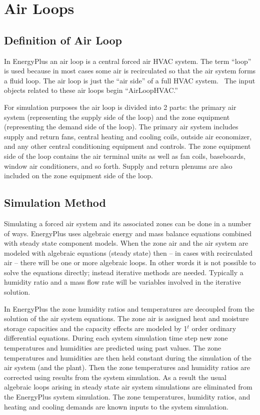 \section{Air Loops}\label{air-loops}

\subsection{Definition of Air Loop}\label{definition-of-air-loop}

In EnergyPlus an air loop is a central forced air HVAC system. The term ``loop'' is used because in most cases some air is recirculated so that the air system forms a fluid loop. The air loop is just the ``air side'' of a full HVAC system.~ The input objects related to these air loops begin ``AirLoopHVAC.''

For simulation purposes the air loop is divided into 2 parts: the primary air system (representing the supply side of the loop) and the zone equipment (representing the demand side of the loop). The primary air system includes supply and return fans, central heating and cooling coils, outside air economizer, and any other central conditioning equipment and controls. The zone equipment side of the loop contains the air terminal units as well as fan coils, baseboards, window air conditioners, and so forth. Supply and return plenums are also included on the zone equipment side of the loop.

\subsection{Simulation Method}\label{simulation-method}

Simulating a forced air system and its associated zones can be done in a number of ways. EnergyPlus uses algebraic energy and mass balance equations combined with steady state component models. When the zone air and the air system are modeled with algebraic equations (steady state) then -- in cases with recirculated air -- there will be one or more algebraic loops. In other words it is not possible to solve the equations directly; instead iterative methods are needed. Typically a humidity ratio and a mass flow rate will be variables involved in the iterative solution.

In EnergyPlus the zone humidity ratios and temperatures are decoupled from the solution of the air system equations. The zone air is assigned heat and moisture storage capacities and the capacity effects are modeled by 1\(^{t}\) order ordinary differential equations. During each system simulation time step new zone temperatures and humidities are predicted using past values. The zone temperatures and humidities are then held constant during the simulation of the air system (and the plant). Then the zone temperatures and humidity ratios are corrected using results from the system simulation. As a result the usual algebraic loops arising in steady state air system simulations are eliminated from the EnergyPlus system simulation. The zone temperatures, humidity ratios, and heating and cooling demands are known inputs to the system simulation.

